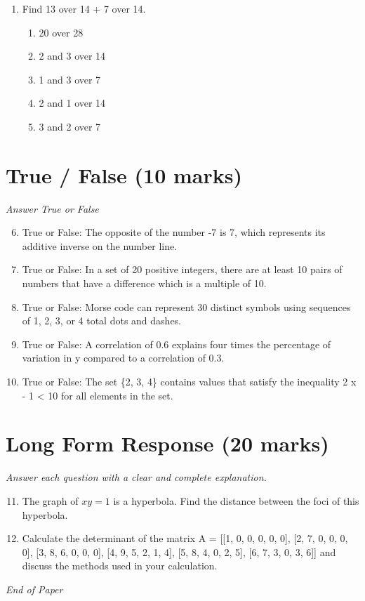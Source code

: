\documentclass[12pt]{article}
\begin{document}
\begin{enumerate}[label=\arabic*.]
\begin{enumerate}[label=(\alph*)]
    \item 19.0
    \item 17.0
    \item 25.0
    \item 23.0
    \item 18.0
\end{enumerate}
\item Find 13 over 14 + 7 over 14.
\begin{enumerate}[label=(\alph*)]
    \item 20 over 28
    \item 2 and 3 over 14
    \item 1 and 3 over 7
    \item 2 and 1 over 14
    \item 3 and 2 over 7
\end{enumerate}
\end{enumerate}

\section*{True / False (10 marks)}
\textit{Answer True or False}
\begin{enumerate}[label=\arabic*.]
\setcounter{enumi}{5}
\item True or False: The opposite of the number -7 is 7, which represents its additive inverse on the number line.
\item True or False: In a set of 20 positive integers, there are at least 10 pairs of numbers that have a difference which is a multiple of 10.
\item True or False: Morse code can represent 30 distinct symbols using sequences of 1, 2, 3, or 4 total dots and dashes.
\item True or False: A correlation of 0.6 explains four times the percentage of variation in y compared to a correlation of 0.3.
\item True or False: The set \{2, 3, 4\} contains values that satisfy the inequality 2 x - 1 \textless{} 10 for all elements in the set.
\end{enumerate}

\section*{Long Form Response (20 marks)}
\textit{Answer each question with a clear and complete explanation.}
\begin{enumerate}[label=\arabic*.]
\setcounter{enumi}{10}
\item The graph of $xy = 1$ is a hyperbola. Find the distance between the foci of this hyperbola.
\item Calculate the determinant of the matrix A = [[1, 0, 0, 0, 0, 0], [2, 7, 0, 0, 0, 0], [3, 8, 6, 0, 0, 0], [4, 9, 5, 2, 1, 4], [5, 8, 4, 0, 2, 5], [6, 7, 3, 0, 3, 6]] and discuss the methods used in your calculation.
\end{enumerate}

\vfill
\noindent\textit{End of Paper}
\end{document}
